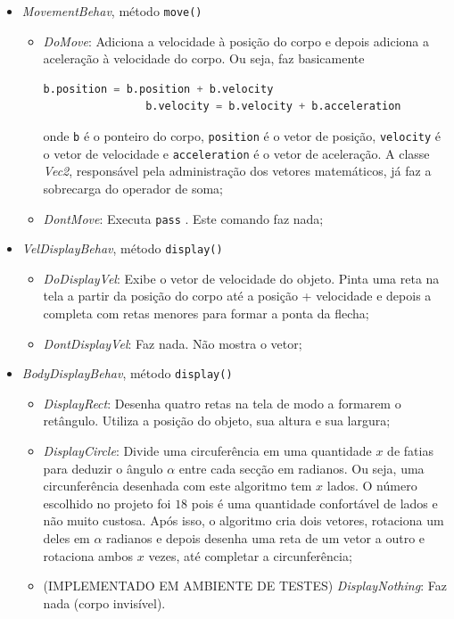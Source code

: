 \documentclass[11pt]{article}
\begin{document}
\begin{itemize}
    \item \textit{MovementBehav}, método \verb|move()|
    \begin{itemize}
        \item \textit{DoMove}: Adiciona a velocidade à posição do corpo e depois adiciona a aceleração à velocidade do corpo. Ou seja, faz basicamente
            \begin{lstlisting}[language=Python]
                b.position = b.position + b.velocity
                b.velocity = b.velocity + b.acceleration
            \end{lstlisting}
        onde \verb|b| é o ponteiro do corpo, \verb|position| é o vetor de posição, \verb|velocity| é o vetor de velocidade e \verb|acceleration| é o vetor de aceleração. A classe \textit{Vec2}, responsável pela administração dos vetores matemáticos, já faz a sobrecarga do operador de soma;
        \item \textit{DontMove}: Executa \verb|pass| \cite{pass}. Este comando faz nada;
    \end{itemize}

    \item \textit{VelDisplayBehav}, método \verb|display()|
    \begin{itemize}
        \item \textit{DoDisplayVel}: Exibe o vetor de velocidade do objeto. Pinta uma reta na tela a partir da posição do corpo até a posição + velocidade e depois a completa com retas menores para formar a ponta da flecha;
        \item \textit{DontDisplayVel}: Faz nada. Não mostra o vetor;
    \end{itemize}
    
    \item \textit{BodyDisplayBehav}, método \verb|display()|
    \begin{itemize}
        \item \textit{DisplayRect}: Desenha quatro retas na tela de modo a formarem o retângulo. Utiliza a posição do objeto, sua altura e sua largura;
        \item \textit{DisplayCircle}: Divide uma circuferência em uma quantidade $x$ de fatias para deduzir o ângulo $\alpha$ entre cada secção em radianos. Ou seja, uma circunferência desenhada com este algoritmo tem $x$ lados. O número escolhido no projeto foi $18$ pois é uma quantidade confortável de lados e não muito custosa. Após isso, o algoritmo cria dois vetores, rotaciona um deles em $\alpha$ radianos e depois desenha uma reta de um vetor a outro e rotaciona ambos $x$ vezes, até completar a circunferência;
        \item (IMPLEMENTADO EM AMBIENTE DE TESTES) \textit{DisplayNothing}: Faz nada (corpo invisível).
    \end{itemize}
\end{itemize}

\printbibliography %
	
\end{document}
